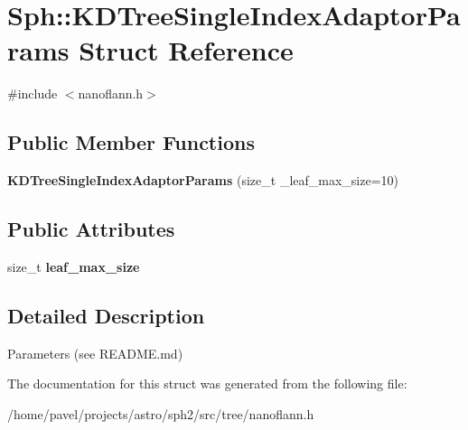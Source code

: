 \hypertarget{structSph_1_1KDTreeSingleIndexAdaptorParams}{}\section{Sph\+:\+:K\+D\+Tree\+Single\+Index\+Adaptor\+Params Struct Reference}
\label{structSph_1_1KDTreeSingleIndexAdaptorParams}


{\ttfamily \#include $<$nanoflann.\+h$>$}

\subsection*{Public Member Functions}
\begin{DoxyCompactItemize}
\item 
\hypertarget{structSph_1_1KDTreeSingleIndexAdaptorParams_afd2be3b33dd16f91d49418319f099d03}{}\label{structSph_1_1KDTreeSingleIndexAdaptorParams_afd2be3b33dd16f91d49418319f099d03} 
{\bfseries K\+D\+Tree\+Single\+Index\+Adaptor\+Params} (size\+\_\+t \+\_\+leaf\+\_\+max\+\_\+size=10)
\end{DoxyCompactItemize}
\subsection*{Public Attributes}
\begin{DoxyCompactItemize}
\item 
\hypertarget{structSph_1_1KDTreeSingleIndexAdaptorParams_a46daa5c75e4141b14ada18f6180cb2dc}{}\label{structSph_1_1KDTreeSingleIndexAdaptorParams_a46daa5c75e4141b14ada18f6180cb2dc} 
size\+\_\+t {\bfseries leaf\+\_\+max\+\_\+size}
\end{DoxyCompactItemize}


\subsection{Detailed Description}
Parameters (see R\+E\+A\+D\+M\+E.\+md) 

The documentation for this struct was generated from the following file\+:\begin{DoxyCompactItemize}
\item 
/home/pavel/projects/astro/sph2/src/tree/nanoflann.\+h\end{DoxyCompactItemize}
